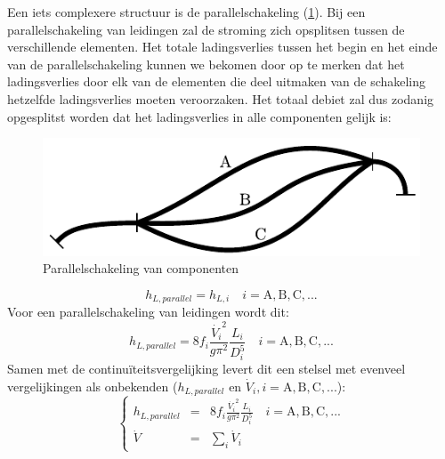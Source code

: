 Een iets complexere structuur is de parallelschakeling (\ref{fig:parallelschakeling}). Bij een parallelschakeling van leidingen zal de stroming zich opsplitsen tussen de verschillende elementen. Het totale ladingsverlies tussen het begin en het einde van de parallelschakeling kunnen we bekomen door op te merken dat het ladingsverlies door elk van de elementen die deel uitmaken van de schakeling hetzelfde ladingsverlies moeten veroorzaken. Het totaal debiet zal dus zodanig opgesplitst worden dat het ladingsverlies in alle componenten gelijk is:
\begin{figure}
	\centering
	\includegraphics{fig/leidingstelsels/parallelschakeling}
	\caption{Parallelschakeling van componenten}
	\label{fig:parallelschakeling}
\end{figure}
\begin{equation}
	h_{L,parallel} = h_{L,i} \quad i=\mathrm{A},\mathrm{B},\mathrm{C},...
\end{equation}
Voor een parallelschakeling van leidingen wordt dit:
\begin{equation}
	h_{L,parallel} = 8 f_i \frac{\dot{V_i}^2}{g \pi^2} \frac{L_i}{D^5_i} \quad i=\mathrm{A},\mathrm{B},\mathrm{C},...
\end{equation}
Samen met de continuïteitsvergelijking levert dit een stelsel met evenveel vergelijkingen als onbekenden ($h_{L,parallel}$ en $\dot{V}_i, i=\mathrm{A},\mathrm{B},\mathrm{C},...$):
\begin{equation}
	\left\{
	\begin{array}{lcl}
		h_{L,parallel} &=& 8 f_i \frac{\dot{V_i}^2}{g \pi^2} \frac{L_i}{D^5_i} \quad i=\mathrm{A},\mathrm{B},\mathrm{C},... \\
		\dot{V} &=& \sum_i \dot{V}_i
	\end{array}
	\right.
	\label{eqn:parallelschakeling}
\end{equation}

